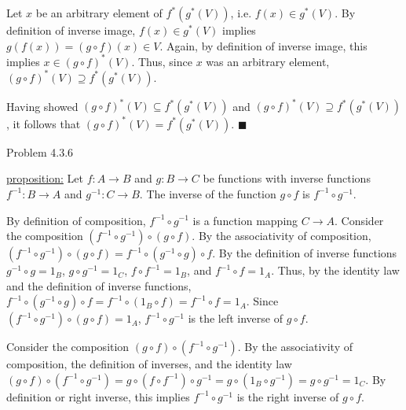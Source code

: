 \documentclass{article}
\theoremstyle{definition}
\begin{document}
	Let $x$ be an arbitrary element of $f^*(g^*(V))$, i.e. $f(x)\in
	g^*(V)$. By definition of inverse image, $f(x)\in g^*(V)$ implies
	$g(f(x))=(g\circ f)(x)\in V$. Again, by definition of inverse
	image, this implies $x\in (g\circ f)^*(V)$. Thus, since $x$ was an
	arbitrary element, $(g\circ f)^*(V)\supseteq f^*(g^*(V))$.

	Having showed $(g\circ f)^*(V)\subseteq f^*(g^*(V))$ and $(g\circ
	f)^*(V)\supseteq f^*(g^*(V))$, it follows that $(g\circ f)^*(V)=
	f^*(g^*(V))$.  $\blacksquare$

	\vspace{1cm}




	\noindent Problem 4.3.6  \vspace{0.3cm}

	\underline{proposition:}  Let $f:A\rightarrow B$ and $g:B\rightarrow
	C$ be functions with inverse functions $f^{-1}:B\rightarrow A$ and
	$g^{-1}:C\rightarrow B$. The inverse of the function $g\circ f$ is
	$f^{-1}\circ g^{-1}$.

	\vspace{0.2cm}


	\vspace{0.15cm}

	By definition of composition, $f^{-1}\circ g^{-1}$ is a function
	mapping $C\rightarrow A$. Consider the composition $(f^{-1}\circ
	g^{-1})\circ (g\circ f)$. By the associativity of composition,
	$(f^{-1}\circ g^{-1})\circ (g\circ f)=f^{-1}\circ(g^{-1}\circ
	g)\circ f$. By the definition of inverse functions $g^{-1}\circ
	g=1_B$, $g\circ g^{-1}=1_C$, $f\circ f^{-1}=1_B$, and $f^{-1}\circ
	f=1_A$. Thus, by the identity law and the definition of inverse
	functions, $f^{-1}\circ (g^{-1}\circ g)\circ f=f^{-1}\circ (1_B\circ
	f)=f^{-1}\circ f=1_A$. Since $(f^{-1}\circ g^{-1})\circ (g\circ
	f)=1_A$, $f^{-1}\circ g^{-1}$ is the left inverse of $g\circ f$.

	Consider the composition $(g\circ f)\circ(f^{-1}\circ g^{-1})$. By
	the associativity of composition, the definition of inverses, and
	the identity law $(g\circ f)\circ(f^{-1}\circ g^{-1})=g\circ (f\circ
	f^{-1})\circ g^{-1}=g\circ(1_B\circ g^{-1})=g\circ g^{-1}=1_C$. By
	definition or right inverse, this implies $f^{-1}\circ g^{-1}$ is
	the right inverse of $g\circ f$.
\end{document}
